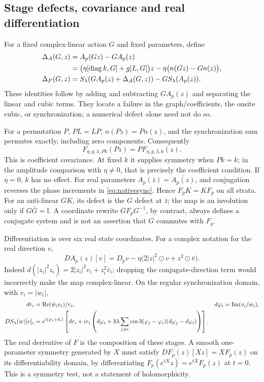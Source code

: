 \documentclass[11pt,a4paper]{article}
\numberwithin{equation}{section}
\newcommand{\re}{\operatorname{Re}}\newcommand{\rank}{\operatorname{rank}}
\newcommand{\I}{\mathbb I}\newcommand{\Argz}{\operatorname{Arg}_0}
\begin{document}
\subsection{Stage defects, covariance and real differentiation}\label{sec:defects}
For a fixed complex-linear action $G$ and fixed parameters, define
\begin{align}
 \Delta_A(G,z)&=A_p(Gz)-GA_p(z)\nonumber\\
 &=\bigl(\eta[\operatorname{diag} k,G]+g[L,G]\bigr)z-\eta\bigl(n(Gz)-Gn(z)\bigr),\label{eq:ampdef}\\
 \Delta_F(G,z)&=S_\lambda(GA_p(z)+\Delta_A(G,z))-GS_\lambda(A_p(z)).\label{eq:fulldef}
\end{align}
These identities follow by adding and subtracting $GA_p(z)$ and separating the linear and cubic terms. They locate a failure in the graph/coefficients, the onsite cubic, or synchronization; a numerical defect alone need not do so.

For a permutation $P$, $PL=LP$, $n(Pz)=Pn(z)$, and the synchronization sum permutes exactly, including zero components. Consequently
\begin{equation}\label{eq:covariance}
 F_{\eta,g,\lambda,Pk}(Pz)=P F_{\eta,g,\lambda,k}(z).
\end{equation}
This is coefficient covariance. At fixed $k$ it supplies symmetry when $Pk=k$; in the amplitude comparison with $\eta\ne0$, that is precisely the coefficient condition. If $\eta=0$, $k$ has no effect. For real parameters $A_p(\bar z)=\overline{A_p(z)}$, and conjugation reverses the phase increments in \eqref{eq:nativesync}. Hence $F_pK=KF_p$ on all strata. For an anti-linear $GK$, its defect is the $G$ defect at $\bar z$; the map is an involution only if $G\bar G=\I$. A coordinate rewrite $GF_pG^{-1}$, by contrast, always defines a conjugate system and is not an assertion that $G$ commutes with $F_p$.

Differentiation is over six real state coordinates. For a complex notation for the real direction $v$,
\begin{equation}\label{eq:ampderivative}
 DA_p(z)[v]=D_pv-\eta\bigl(2|z|^2\odot v+z^2\odot\bar v\bigr).
\end{equation}
Indeed $d(|z_i|^2z_i)=2|z_i|^2v_i+z_i^2\bar v_i$; dropping the conjugate-direction term would incorrectly make the map complex-linear. On the regular synchronization domain, with $r_i=|w_i|$,
\begin{align}
 dr_i&=\re(\bar w_i v_i)/r_i,& d\varphi_i&=\im(v_i/w_i),\nonumber\\
 DS_\lambda(w)[v]_i
 &=e^{i(\varphi_i+d_i)}\left[dr_i+i r_i\left(d\varphi_i+
 3\lambda\sum_{j\ne i}\cos3(\varphi_j-\varphi_i)(d\varphi_j-d\varphi_i)\right)\right].\label{eq:syncderivative}
\end{align}
The real derivative of $F$ is the composition of these stages. A smooth one-parameter symmetry generated by $X$ must satisfy $DF_p(z)[Xz]=XF_p(z)$ on its differentiability domain, by differentiating $F_p(e^{tX}z)=e^{tX}F_p(z)$ at $t=0$. This is a symmetry test, not a statement of holomorphicity.
\end{document}
